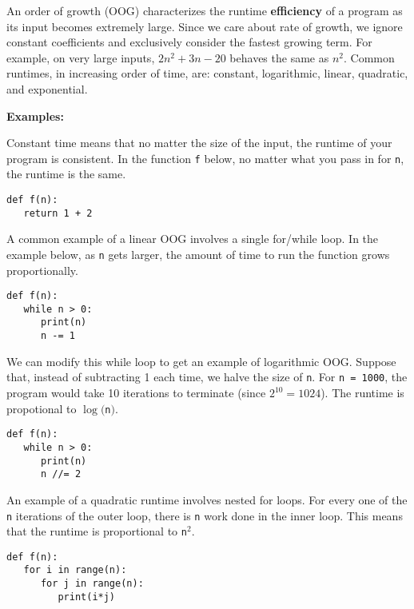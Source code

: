 An order of growth (OOG) characterizes the runtime \textbf{efficiency} of a program as its input becomes extremely large. Since we care about rate of growth, we ignore constant coefficients and exclusively consider the fastest growing term. For example, on very large inputs, $2n^2 + 3n - 20$ behaves the same as $n^2$. Common runtimes, in increasing order of time, are: constant, logarithmic, linear, quadratic, and exponential.

\textbf{Examples:}

Constant time means that no matter the size of the input, the runtime of your program is consistent. In the function \lstinline{f} below, no matter what you pass in for \lstinline{n}, the runtime is the same. \\
\begin{lstlisting}
def f(n):
   return 1 + 2
\end{lstlisting}
A common example of a linear OOG involves a single for/while loop. In the example below, as \lstinline{n} gets larger, the amount of time to run the function grows proportionally. \\
\begin{lstlisting}
def f(n):
   while n > 0:
      print(n)
      n -= 1
\end{lstlisting}
We can modify this while loop to get an example of logarithmic OOG. Suppose that, instead of subtracting 1 each time, we halve the size of \lstinline{n}. For \lstinline{n = 1000}, the program would take 10 iterations to terminate (since $2^{10} = 1024$). The runtime is propotional to $\log($\lstinline{n}$)$.
\begin{lstlisting}
def f(n):
   while n > 0:
      print(n)
      n //= 2
\end{lstlisting}
An example of a quadratic runtime involves nested for loops. For every one of the \lstinline{n} iterations of the outer loop, there is \lstinline{n} work done in the inner loop. This means that the runtime is proportional to \lstinline{n}$^{2}$. \\
\begin{lstlisting}
def f(n):
   for i in range(n):
      for j in range(n):
         print(i*j)
\end{lstlisting}

